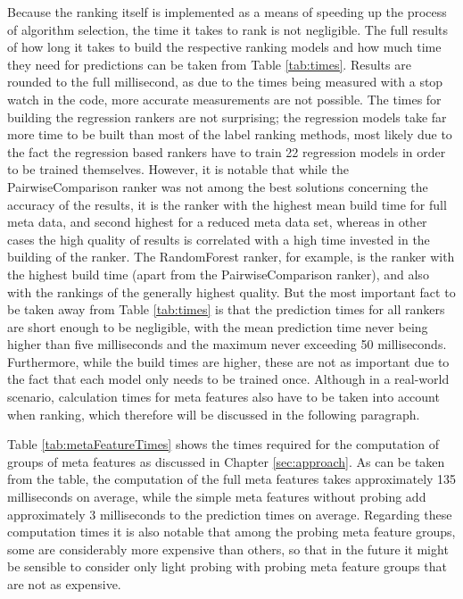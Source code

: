 Because the ranking itself is implemented as a means of speeding up the process of algorithm selection, the time it takes to rank is not negligible. The full results of how long it takes to build the respective ranking models and how much time they need for predictions can be taken from Table \ref{tab:times}. Results are rounded to the full millisecond, as due to the times being measured with a stop watch in the code, more accurate measurements are not possible. The times for building the regression rankers are not surprising; the regression models take far more time to be built than most of the label ranking methods, most likely due to the fact the regression based rankers have to train 22 regression models in order to be trained themselves. However, it is notable that while the PairwiseComparison ranker was not among the best solutions concerning the accuracy of the results, it is the ranker with the highest mean build time for full meta data, and second highest for a reduced meta data set, whereas in other cases the high quality of results is correlated with a high time invested in the building of the ranker. The RandomForest ranker, for example, is the ranker with the highest build time (apart from the PairwiseComparison ranker), and also with the rankings of the generally highest quality. But the most important fact to be taken away from Table \ref{tab:times} is that the prediction times for all rankers are short enough to be negligible, with the mean prediction time never being higher than five milliseconds and the maximum never exceeding 50 milliseconds. Furthermore, while the build times are higher, these are not as important due to the fact that each model only needs to be trained once. Although in a real-world scenario, calculation times for meta features also have to be taken into account when ranking, which therefore will be discussed in the following paragraph.



Table \ref{tab:metaFeatureTimes} shows the times required for the computation of groups of meta features as discussed in Chapter \ref{sec:approach}. As can be taken from the table, the computation of the full meta features takes approximately 135 milliseconds on average, while the simple meta features without probing add approximately 3 milliseconds to the prediction times on average. Regarding these computation times it is also notable that among the probing meta feature groups, some are considerably more expensive than others, so that in the future it might be sensible to consider only light probing with probing meta feature groups that are not as expensive.

